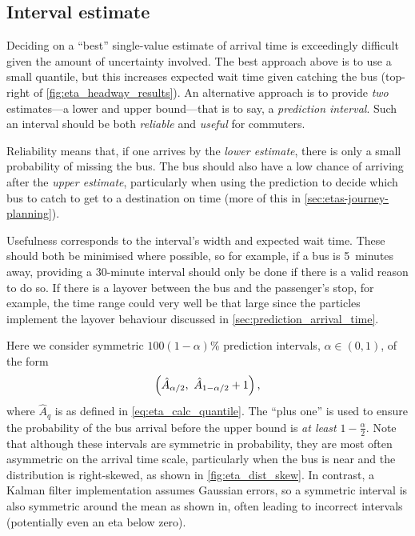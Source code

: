 \subsection{Interval estimate}
\label{sec:etas-interval}


Deciding on a ``best'' single-value estimate of arrival time is exceedingly difficult given the amount of uncertainty involved. The best approach above is to use a small quantile, but this increases expected wait time given catching the bus (top-right of \cref{fig:eta_headway_results}). An alternative approach is to provide \emph{two} estimates---a lower and upper bound---that is to say, a \emph{prediction interval}. Such an interval should be both \emph{reliable} and \emph{useful} for commuters.

Reliability means that, if one arrives by the \emph{lower estimate}, there is only a small probability of missing the bus. The bus should also have a low chance of arriving after the \emph{upper estimate}, particularly when using the prediction to decide which bus to catch to get to a destination on time (more of this in \cref{sec:etas-journey-planning}).

Usefulness corresponds to the interval's width and expected wait time. These should both be minimised where possible, so for example, if a bus is 5~minutes away, providing a 30-minute interval should only be done if there is a valid reason to do so. If there is a layover between the bus and the passenger's stop, for example, the time range could very well be that large since the particles implement the layover behaviour discussed in \cref{sec:prediction_arrival_time}.







Here we consider symmetric $100(1-\alpha)$\% prediction intervals, $\alpha\in (0,1)$, of the form
\begin{equation}
\left(\hat\Teta_{\alpha/2},\ \hat\Teta_{1-\alpha/2}+1\right),
\end{equation}
where $\hat A_q$ is as defined in \cref{eq:eta_calc_quantile}. The ``plus one'' is used to ensure the probability of the bus arrival before the upper bound is \emph{at least} $1-\frac{\alpha}{2}$. Note that although these intervals are symmetric in probability, they are most often asymmetric on the arrival time scale, particularly when the bus is near and the distribution is right-skewed, as shown in \cref{fig:eta_dist_skew}. In contrast, a Kalman filter implementation assumes Gaussian errors, so a symmetric interval is also symmetric around the mean as shown in, often leading to incorrect intervals (potentially even an \gls{eta} below zero).


